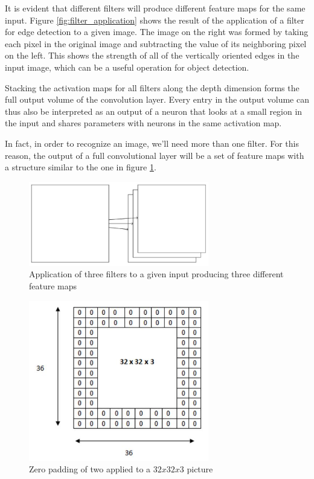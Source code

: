 It is evident that different filters will produce different feature maps for the same input. Figure \ref{fig:filter_application} shows the result of the application of a filter for edge detection to a given image. The image on the right was formed by taking each pixel in the original image and subtracting the value of its neighboring pixel on the left. This shows the strength of all of the vertically oriented edges in the input image, which can be a useful operation for object detection.

Stacking the activation maps for all filters along the depth dimension forms the full output volume of the convolution layer. Every entry in the output volume can thus also be interpreted as an output of a neuron that looks at a small region in the input and shares parameters with neurons in the same activation map.

In fact, in order to recognize an image, we'll need more than one filter. For this reason, the output of a full convolutional layer will be a set of feature maps with a structure similar to the one in figure \ref{fig:feature_maps}.

\begin{figure}[ht]
	\centering
	\includegraphics[width=0.7\textwidth]{Images/feature_maps}
	\caption{Application of three filters to a given input producing three different feature maps}\label{fig:feature_maps}
\end{figure}

\begin{figure}[ht]
	\centering
	\includegraphics[width=0.7\textwidth]{Images/zero_padding}
	\caption{Zero padding of two applied to a $32x32x3$ picture}\label{fig:zero_padding}
\end{figure}

